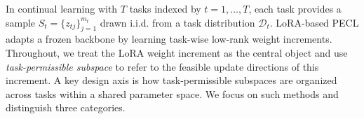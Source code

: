 \documentclass{article}
\theoremstyle{plain}
\theoremstyle{definition}
\theoremstyle{remark}
\begin{document}




In continual learning with \(T\) tasks indexed by \(t=1,\dots,T\), each task provides a sample \(S_t=\{z_{tj}\}_{j=1}^{m_t}\) drawn i.i.d. from a task distribution \(\mathcal{D}_t\). LoRA-based PECL adapts a frozen backbone by learning task-wise low-rank weight increments. Throughout, we treat the LoRA {weight increment} as the central object and use \emph{task-permissible subspace} to refer to the feasible update directions of this increment. A key design axis is how task-permissible subspaces are organized across tasks within a shared parameter space. We focus on such methods and distinguish three categories.

\end{document}
